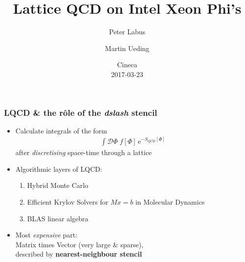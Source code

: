 \documentclass{beamer}
\begin{document}
\allowdisplaybreaks[1]

\title{Lattice QCD on Intel Xeon Phi's}
\author{Peter Labus \and Martin Ueding }
  \date{Cineca \\ 2017-03-23}


  \begin{frame}
    \titlepage
  \end{frame}


  \setcounter{framenumber}{0}

  \begin{frame}
    \frametitle{LQCD \& the r\^ole of the \textit{dslash} stencil}

    \begin{itemize}
      \item  Calculate integrals of the form
        \begin{align*}
          \int \mathcal D \Phi \; f[\Phi] \, \mathrm e^{-S_\text{QCD}[\Phi]}
        \end{align*}
        after \textit{discretising} space-time through a lattice
        \vfill

      \item Algorithmic layers of LQCD:
        \begin{enumerate}
          \item Hybrid Monte Carlo
          \item Efficient Krylov Solvers for $Mx=b$ in Molecular Dynamics
          \item BLAS linear algebra
        \end{enumerate}
        \vfill

      \item Most \textit{expensive} part:\\[1mm]
        \hspace{2mm} Matrix times Vector (very large \& sparse),\\
        \hspace{2mm} described by \textbf{nearest-neighbour stencil}
        \vfill
    \end{itemize}

  \end{frame}

\end{document}
